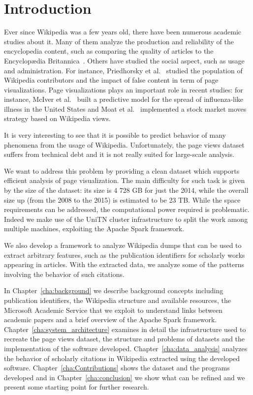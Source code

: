 
\chapter*{Introduction} %
\label{introduction}
Ever since Wikipedia was a few years old, there have been numerous academic studies about it.
Many of them analyze the production and reliability of the encyclopedia content, such as comparing the quality of articles to the Encyclopædia Britannica~\cite{Giles2005}.
Others have studied the social aspect, such as usage and administration.
For instance, Priedhorsky et al.~\cite{Priedhorsky2007} studied the population of Wikipedia contributors and the impact of false content in term of page visualizations.
Page visualizations plays an important role in recent studies:
for instance, McIver et al.~\cite{McIver2014} built a predictive model for the spread of influenza-like illness in the United States and Moat et al.~\cite{Moat2013} implemented a stock market moves strategy based on Wikipedia views.

It is very interesting to see that it is possible to predict behavior of many phenomena from the usage of Wikipedia.
Unfortunately, the page views dataset suffers from technical debt and it is not really suited for large-scale analysis.

We want to address this problem by providing a clean dataset which supports efficient analysis of page visualization.
The main difficulty for such task is given by the size of the dataset: its size is 4 728 GB for just the 2014, while the overall size up (from the 2008 to the 2015) is estimated to be 23 TB.
While the space requirements can be addressed, the computational power required is problematic.
Indeed we make use of the UniTN cluster infrastructure to split the work among multiple machines, exploiting the Apache Spark framework.

We also develop a framework to analyze Wikipedia dumps that can be used to extract arbitrary features, such as the publication identifiers for scholarly works appearing in articles.
With the extracted data, we analyze some of the patterns involving the behavior of such citations.

In Chapter~\ref{cha:background} we describe background concepts including publication identifiers, the Wikipedia structure and available resources, the Microsoft Academic Service that we exploit to understand links between academic papers and a brief overview of the Apache Spark framework.
Chapter~\ref{cha:system_architecture} examines in detail the infrastructure used to recreate the page views dataset, the structure and problems of datasets and the implementation of the software developed.
Chapter~\ref{cha:data_analysis} analyzes the behavior of scholarly citations in Wikipedia extracted using the developed software.
Chapter~\ref{cha:Contributions} shows the dataset and the programs developed and
in Chapter~\ref{cha:conclusion} we show what can be refined and we present some starting point for further research.
